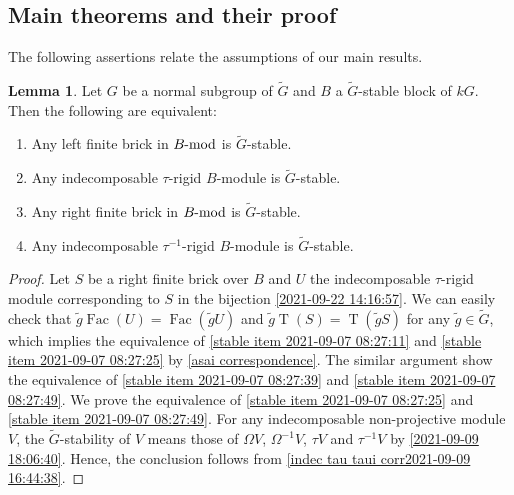 \documentclass[pdftex,a4paper]{article}
\numberwithin{equation}{subsection}
\theoremstyle{definition}
\newtheorem{lemma}[theorem]{Lemma}
\newcommand{\lmod}{\operatorname{\mathrm{\hspace{-2pt}-mod}}}
\newcommand{\Fac}{\operatorname{\mathrm{Fac}}}
\newcommand{\torscl}{\operatorname{\mathrm{T}}}
\begin{document}
\subsection{Main theorems and their proof}
The following assertions relate the assumptions of our main results.
\begin{lemma}\label{stable bricks conditions 2021-09-30 17:16:10}
	Let \(G\) be a normal subgroup of \(\tilde{G}\) and \(B\) a \(\tilde{G}\)-stable block of \(kG\). Then the following are equivalent:
	\begin{enumerate}
		\item Any left finite brick in \(B\lmod\) is \(\tilde{G}\)-stable.\label{stable item 2021-09-07 08:27:11}
		\item Any indecomposable \(\tau\)-rigid \(B\)-module is \(\tilde{G}\)-stable.\label{stable item 2021-09-07 08:27:25}
		\item Any right finite brick in \(B\lmod\) is \(\tilde{G}\)-stable.\label{stable item 2021-09-07 08:27:39}
		\item Any indecomposable \(\tau^{-1}\)-rigid \(B\)-module is \(\tilde{G}\)-stable.\label{stable item 2021-09-07 08:27:49}
	\end{enumerate}
\end{lemma}
\begin{proof}
	Let \(S\) be a right finite  brick over \(B\) and \(U\) the indecomposable \(\tau\)-rigid module corresponding to \(S\) in the bijection \eqref{2021-09-22 14:16:57}.
	We can easily check that \(\tilde{g}\Fac(U)=\Fac(\tilde{g}U)\) and \(\tilde{g}\torscl(S)=\torscl(\tilde{g}S)\) for any \(\tilde{g}\in \tilde{G}\), which implies the equivalence of \ref{stable item 2021-09-07 08:27:11} and \ref{stable item 2021-09-07 08:27:25} by \cref{asai correspondence}.
	The similar argument show the equivalence of \ref{stable item 2021-09-07 08:27:39} and \ref{stable item 2021-09-07 08:27:49}.
	We prove the equivalence of \ref{stable item 2021-09-07 08:27:25} and \ref{stable item 2021-09-07 08:27:49}.
	For any indecomposable non-projective module \(V\), the \(\tilde{G}\)-stability of \(V\) means those of \(\Omega V\), \(\Omega^{-1} V\), \(\tau V\) and \(\tau^{-1} V\) by \cref{2021-09-09 18:06:40}.
	Hence, the conclusion follows from \cref{indec tau taui corr2021-09-09 16:44:38}.
\end{proof}
\end{document}
